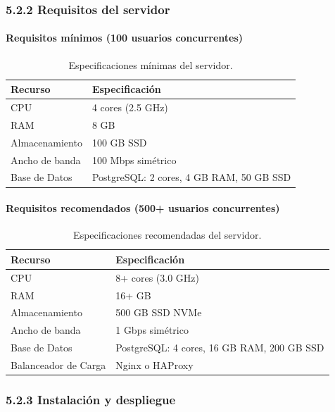 \subsubsection{5.2.2 Requisitos del servidor}

\paragraph{Requisitos mínimos (100 usuarios concurrentes)}

\begin{table}[H]
	\centering
	\caption{Especificaciones mínimas del servidor.}
	\begin{tabular}{p{4cm} p{9cm}}
		\toprule
		Recurso & Especificación \\
		\midrule
		CPU & 4 cores (2.5 GHz) \\
		RAM & 8 GB \\
		Almacenamiento & 100 GB SSD \\
		Ancho de banda & 100 Mbps simétrico \\
		Base de Datos & PostgreSQL: 2 cores, 4 GB RAM, 50 GB SSD \\
		\bottomrule
	\end{tabular}
\end{table}

\paragraph{Requisitos recomendados (500+ usuarios concurrentes)}

\begin{table}[H]
	\centering
	\caption{Especificaciones recomendadas del servidor.}
	\begin{tabular}{p{4cm} p{9cm}}
		\toprule
		Recurso & Especificación \\
		\midrule
		CPU & 8+ cores (3.0 GHz) \\
		RAM & 16+ GB \\
		Almacenamiento & 500 GB SSD NVMe \\
		Ancho de banda & 1 Gbps simétrico \\
		Base de Datos & PostgreSQL: 4 cores, 16 GB RAM, 200 GB SSD \\
		Balanceador de Carga & Nginx o HAProxy \\
		\bottomrule
	\end{tabular}
\end{table}

\subsubsection{5.2.3 Instalación y despliegue}


